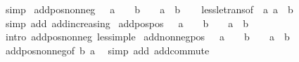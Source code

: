 \begin{isabellebody}
\ simp%
\endisatagproof
{\isafoldproof}%
%
\isadelimproof
\isanewline
%
\endisadelimproof
\isanewline
{}\isamarkupfalse%
\ add{\isacharunderscore}{\kern0pt}pos{\isacharunderscore}{\kern0pt}nonneg{\isacharcolon}{\kern0pt}\ {\isachardoublequoteopen}{}\ {\isacharless}{\kern0pt}\ a\ {\isasymLongrightarrow}\ {}\ {\isasymle}\ b\ {\isasymLongrightarrow}\ {}\ {\isacharless}{\kern0pt}\ a\ {\isacharplus}{\kern0pt}\ b{\isachardoublequoteclose}\isanewline
%
\isadelimproof
\ \ %
\endisadelimproof
%
\isatagproof
{}\isamarkupfalse%
\ less{\isacharunderscore}{\kern0pt}le{\isacharunderscore}{\kern0pt}trans{\isacharbrackleft}{\kern0pt}of\ {}\ a\ {\isachardoublequoteopen}a\ {\isacharplus}{\kern0pt}\ b{\isachardoublequoteclose}{\isacharbrackright}{\kern0pt}\ \isamarkupfalse%
\ {\isacharparenleft}{\kern0pt}simp\ add{\isacharcolon}{\kern0pt}\ add{\isacharunderscore}{\kern0pt}increasing{}{\isacharparenright}{\kern0pt}%
\endisatagproof
{\isafoldproof}%
%
\isadelimproof
\isanewline
%
\endisadelimproof
\isanewline
{}\isamarkupfalse%
\ add{\isacharunderscore}{\kern0pt}pos{\isacharunderscore}{\kern0pt}pos{\isacharcolon}{\kern0pt}\ {\isachardoublequoteopen}{}\ {\isacharless}{\kern0pt}\ a\ {\isasymLongrightarrow}\ {}\ {\isacharless}{\kern0pt}\ b\ {\isasymLongrightarrow}\ {}\ {\isacharless}{\kern0pt}\ a\ {\isacharplus}{\kern0pt}\ b{\isachardoublequoteclose}\isanewline
%
\isadelimproof
\ \ %
\endisadelimproof
%
\isatagproof
{}\isamarkupfalse%
\ {\isacharparenleft}{\kern0pt}intro\ add{\isacharunderscore}{\kern0pt}pos{\isacharunderscore}{\kern0pt}nonneg\ less{\isacharunderscore}{\kern0pt}imp{\isacharunderscore}{\kern0pt}le{\isacharparenright}{\kern0pt}%
\endisatagproof
{\isafoldproof}%
%
\isadelimproof
\isanewline
%
\endisadelimproof
\isanewline
{}\isamarkupfalse%
\ add{\isacharunderscore}{\kern0pt}nonneg{\isacharunderscore}{\kern0pt}pos{\isacharcolon}{\kern0pt}\ {\isachardoublequoteopen}{}\ {\isasymle}\ a\ {\isasymLongrightarrow}\ {}\ {\isacharless}{\kern0pt}\ b\ {\isasymLongrightarrow}\ {}\ {\isacharless}{\kern0pt}\ a\ {\isacharplus}{\kern0pt}\ b{\isachardoublequoteclose}\isanewline
%
\isadelimproof
\ \ %
\endisadelimproof
%
\isatagproof
{}\isamarkupfalse%
\ add{\isacharunderscore}{\kern0pt}pos{\isacharunderscore}{\kern0pt}nonneg{\isacharbrackleft}{\kern0pt}of\ b\ a{\isacharbrackright}{\kern0pt}\ \isamarkupfalse%
\ {\isacharparenleft}{\kern0pt}simp\ add{\isacharcolon}{\kern0pt}\ add{\isacharunderscore}{\kern0pt}commute{\isacharparenright}{\kern0pt}%

\end{isabellebody}
